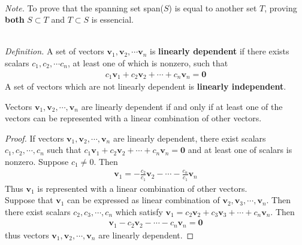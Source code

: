 \noindent \\ \textit{Note.} To prove that the spanning set span($S$) is equal to another set $T$, proving \textbf{both} $S \subset T$ and $T \subset S$ is essencial.

\noindent \\ \textit{Definition.} A set of vectors $\textbf{v}_1, \textbf{v}_2, \cdots \textbf{v}_n$ is \textbf{linearly dependent} if there exists scalars $c_1, c_2, \cdots c_n$, at least one of which is nonzero, such that
\begin{align*}
	c_1\textbf{v}_1 + c_2\textbf{v}_2 + \cdots + c_n\textbf{v}_n = \textbf{0}
\end{align*}
A set of vectors which are not linearly dependent is \textbf{linearly independent}.

\begin{theorem}
	Vectors $\textbf{v}_1, \textbf{v}_2, \cdots, \textbf{v}_n$ are linearly dependent if and only if at least one of the vectors can be represented with a linear combination of other vectors.
\end{theorem}

\begin{proof}
	If vectors $\textbf{v}_1, \textbf{v}_2, \cdots, \textbf{v}_n$ are linearly dependent, there exist scalars $c_1, c_2, \cdots, c_n$ such that $c_1\textbf{v}_1 + c_2\textbf{v}_2 + \cdots + c_n\textbf{v}_n = \textbf{0}$ and at least one of scalars is nonzero. Suppose $c_1 \neq 0$. Then
	\begin{align*}
		\textbf{v}_1 = -\frac{c_2}{c_1}\textbf{v}_2 - \cdots - \frac{c_n}{c_1}\textbf{v}_n
	\end{align*}
	Thus $\textbf{v}_1$ is represented with a linear combination of other vectors.
	\\
	Suppose that $\textbf{v}_1$ can be expressed as linear combination of $\textbf{v}_2, \textbf{v}_3, \cdots, \textbf{v}_n$. Then there exist scalars $c_2, c_3, \cdots, c_n$ which satisfy $\textbf{v}_1 = c_2\textbf{v}_2 + c_3\textbf{v}_3 + \cdots + c_n\textbf{v}_n$. Then 
	\begin{align*}
		\textbf{v}_1 - c_2\textbf{v}_2 - \cdots - c_n\textbf{v}_n = \textbf{0}
	\end{align*} thus vectors $\textbf{v}_1, \textbf{v}_2, \cdots, \textbf{v}_n$ are linearly dependent.
\end{proof}


